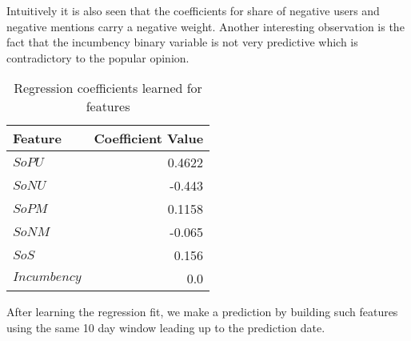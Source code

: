 Intuitively it is also seen that the coefficients for share of negative users and negative mentions carry a negative weight.
Another interesting observation is the fact that the incumbency binary variable is not very predictive which is contradictory to the popular opinion.
\begin{table*}
        \centering
        \begin{tabular}{|l|r|}
        \hline
        Feature & Coefficient Value\\
        \hline
        $SoPU$ & 0.4622\\
        $SoNU$ & -0.443\\
        $SoPM$ & 0.1158\\
        $SoNM$ & -0.065\\
        $SoS$ & 0.156\\
        $Incumbency$ & 0.0\\
        \hline
        \end{tabular}
        \caption{Regression coefficients learned for features}
        \label{table:coeff}
\end{table*}
After learning the regression fit, we make a prediction by building such features using the same 10 day window leading up to the prediction date.

